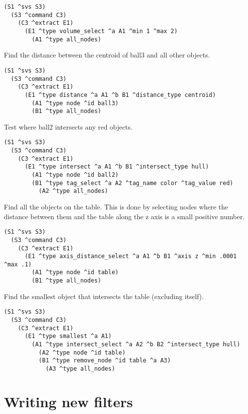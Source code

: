 \begin{verbatim}
(S1 ^svs S3)
  (S3 ^command C3)
    (C3 ^extract E1)
      (E1 ^type volume_select ^a A1 ^min 1 ^max 2)
        (A1 ^type all_nodes)
\end{verbatim}

Find the distance between the centroid of ball3 and all other objects.

\begin{verbatim}
(S1 ^svs S3)
  (S3 ^command C3)
    (C3 ^extract E1)
      (E1 ^type distance ^a A1 ^b B1 ^distance_type centroid)
        (A1 ^type node ^id ball3)
        (B1 ^type all_nodes)
\end{verbatim}

Test where ball2 intersects any red objects.

\begin{verbatim}
(S1 ^svs S3)
  (S3 ^command C3)
    (C3 ^extract E1)
      (E1 ^type intersect ^a A1 ^b B1 ^intersect_type hull)
        (A1 ^type node ^id ball2)
        (B1 ^type tag_select ^a A2 ^tag_name color ^tag_value red)
          (A2 ^type all_nodes)
\end{verbatim}

Find all the objects on the table. This is done by selecting nodes
where the distance between them and the table along the z axis is a small positive number.

\begin{verbatim}
(S1 ^svs S3)
  (S3 ^command C3)
    (C3 ^extract E1)
      (E1 ^type axis_distance_select ^a A1 ^b B1 ^axis z ^min .0001 ^max .1)
        (A1 ^type node ^id table)
        (B1 ^type all_nodes)
\end{verbatim}

Find the smallest object that intersects the table (excluding itself).

\begin{verbatim}
(S1 ^svs S3)
  (S3 ^command C3)
    (C3 ^extract E1)
      (E1 ^type smallest ^a A1)
        (A1 ^type intersect_select ^a A2 ^b B2 ^intersect_type hull)
          (A2 ^type node ^id table)
          (B1 ^type remove_node ^id table ^a A3)
            (A3 ^type all_nodes)
\end{verbatim}


\section{Writing new filters}

